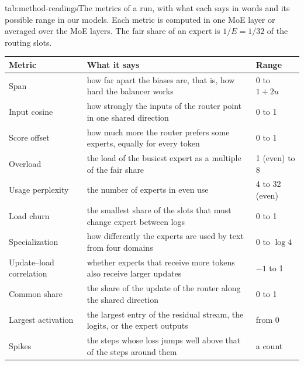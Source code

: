 \begin{table}[The metrics of a run]{tab:method-readings}{The metrics of a run, with what each says in words and its possible range in our models. Each metric is computed in one MoE layer or averaged over the MoE layers. The fair share of an expert is $1/E = 1/32$ of the routing slots.}
  \small
  \begin{tabular}{p{3.5cm}p{9.6cm}p{1.9cm}}
    \toprule
    Metric                   & What it says                                                                                          & Range                     \\
    \midrule
    Span                     & how far apart the biases are, that is, how hard the balancer works                   & 0 to $1 + 2u$             \\
    Input cosine             & how strongly the inputs of the router point in one shared direction                                   & 0 to 1                    \\
    Score offset             & how much more the router prefers some experts, equally for every token                        & 0 to 1                    \\
    Overload                 & the load of the busiest expert as a multiple of the fair share                                        & 1 (even) to 8             \\
    Usage perplexity         & the number of experts in even use                                                                      & 4 to 32 (even)            \\
    Load churn               & the smallest share of the slots that must change expert between logs                          & 0 to 1                    \\
    Specialization           & how differently the experts are used by text from four domains                                         & 0 to $\log 4$             \\
    Update--load correlation & whether experts that receive more tokens also receive larger updates                                   & $-1$ to 1                 \\
    Common share             & the share of the update of the router along the shared direction & 0 to 1 \\
    Largest activation       & the largest entry of the residual stream, the logits, or the expert outputs & from 0                    \\
    Spikes                   & the steps whose loss jumps well above that of the steps around them                          & a count                   \\
    \bottomrule
  \end{tabular}
\end{table}

